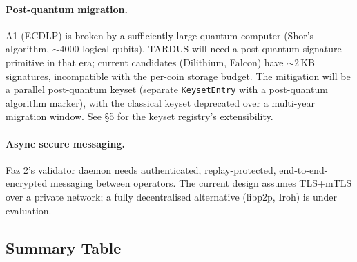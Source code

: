 \paragraph{Post-quantum migration.} A1 (ECDLP) is broken by a
sufficiently large quantum computer (Shor's algorithm, $\sim 4000$
logical qubits). TARDUS will need a post-quantum signature primitive
in that era; current candidates (Dilithium, Falcon) have $\sim 2$\,KB
signatures, incompatible with the per-coin storage budget. The
mitigation will be a parallel post-quantum keyset (separate
\texttt{KeysetEntry} with a post-quantum algorithm marker), with the
classical keyset deprecated over a multi-year migration window. See
\S5 for the keyset registry's extensibility.

\paragraph{Async secure messaging.} Faz 2's validator daemon needs
authenticated, replay-protected, end-to-end-encrypted messaging
between operators. The current design assumes TLS+mTLS over a
private network; a fully decentralised alternative
(libp2p, Iroh) is under evaluation.

\subsection{Summary Table}
\label{sec:failure-summary}

